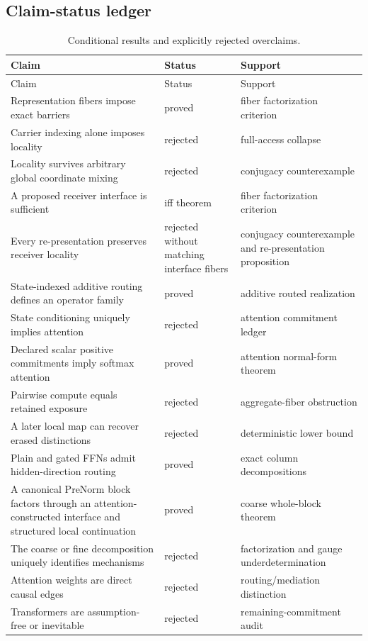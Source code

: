 \subsection{Claim-status ledger}

\begin{longtable}{@{}p{}p{}p{}@{}}
\caption{Conditional results and explicitly rejected overclaims.}\label{tab:supp-claim-status}\\
\toprule
Claim & Status & Support \\
\midrule
\endfirsthead
\toprule
Claim & Status & Support \\
\midrule
\endhead
Representation fibers impose exact barriers & proved & fiber factorization criterion \\
Carrier indexing alone imposes locality & rejected & full-access collapse \\
Locality survives arbitrary global coordinate mixing & rejected & conjugacy counterexample \\
A proposed receiver interface is sufficient & iff theorem & fiber factorization criterion \\
Every re-presentation preserves receiver locality & rejected without matching interface fibers & conjugacy counterexample and re-presentation proposition \\
State-indexed additive routing defines an operator family & proved & additive routed realization \\
State conditioning uniquely implies attention & rejected & attention commitment ledger \\
Declared scalar positive commitments imply softmax attention & proved & attention normal-form theorem \\
Pairwise compute equals retained exposure & rejected & aggregate-fiber obstruction \\
A later local map can recover erased distinctions & rejected & deterministic lower bound \\
Plain and gated FFNs admit hidden-direction routing & proved & exact column decompositions \\
A canonical PreNorm block factors through an attention-constructed interface and structured local continuation & proved & coarse whole-block theorem \\
The coarse or fine decomposition uniquely identifies mechanisms & rejected & factorization and gauge underdetermination \\
Attention weights are direct causal edges & rejected & routing/mediation distinction \\
Transformers are assumption-free or inevitable & rejected & remaining-commitment audit \\
\bottomrule
\end{longtable}
